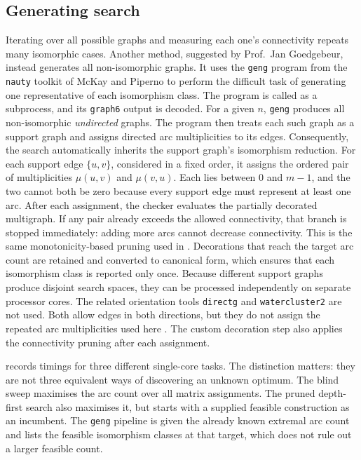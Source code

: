 \subsection{Generating search}
Iterating over all possible graphs and measuring each one's connectivity repeats many isomorphic cases.
Another method, suggested by Prof.\ Jan Goedgebeur, instead generates all non-isomorphic graphs.
It uses the \texttt{geng} program from the \texttt{nauty} toolkit of McKay and Piperno \cite{McKayPiperno14}
to perform the difficult task of generating one representative of each isomorphism class.
The program is called as a subprocess, and its \texttt{graph6} output is decoded.
For a given $n$, \texttt{geng} produces all non-isomorphic \emph{undirected} graphs.
The program then treats each such graph as a support graph and assigns directed arc multiplicities to its edges.
Consequently, the search automatically inherits the support graph's isomorphism reduction.
For each support edge $\{u,v\}$, considered in a fixed order, it assigns the ordered pair
of multiplicities $\mu(u,v)$ and $\mu(v,u)$. Each lies between $0$ and $m-1$, and the two cannot both be zero because every support edge must represent at least one arc.
After each assignment, the checker evaluates the partially decorated multigraph.
If any pair already exceeds the allowed connectivity, that branch is stopped immediately:
adding more arcs cannot decrease connectivity. This is the same monotonicity-based pruning used in .
Decorations that reach the target arc count are retained and converted to canonical form,
which ensures that each isomorphism class is reported only once.
Because different support graphs produce disjoint search spaces, they can be processed independently on separate processor cores.
The related orientation tools \texttt{directg} and \texttt{watercluster2} are not used.
Both allow edges in both directions, but they do not assign the repeated arc multiplicities used here \cite{NautyGuide29}. The custom decoration step also applies the connectivity pruning after each assignment.

 records timings for three different single-core tasks. The distinction matters: they are not three equivalent ways of discovering an unknown optimum.
The blind sweep maximises the arc count over all matrix assignments.
The pruned depth-first search also maximises it, but starts with a supplied feasible construction as an incumbent.
The \texttt{geng} pipeline is given the already known extremal arc count and lists the feasible isomorphism classes at that target, which does not rule out a larger feasible count.

